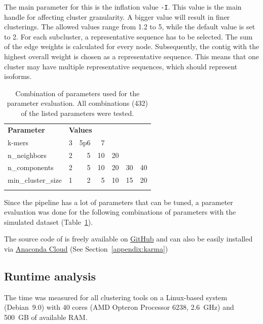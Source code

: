 \documentclass[12pt,a4paper,english]{article}
\begin{document}
	The main parameter for this is the inflation value \texttt{-I}. This value is the main handle for affecting cluster granularity. A bigger value will result in finer clusterings. The allowed values range from 1.2 to 5, while the default value is set to 2.
	For each subcluster, a representative sequence has to be selected. The sum of the edge weights is calculated for every node. Subsequently, the contig with the highest overall weight is chosen as a representative sequence. This means that one cluster may have multiple representative sequences, which should represent isoforms.
	
	\begin{table}
		\caption[Combination of parameters used for the parameter evaluation.]{Combination of parameters used for the parameter evaluation. All combinations (432) of the listed parameters were tested.}
		\label{table:comb}
		\begin{tabular}{lrrrrrr}
			\toprule
			\multicolumn{1}{l}{\textbf{Parameter}} & \multicolumn{5}{l}{\textbf{Values}} \\ \addlinespace
			\midrule
			k-mers & 3 & 5p6 & 7 &  &  &  \\ \addlinespace
			n\_neighbors & 2 & 5 & 10 & 20 &  &  \\ \addlinespace
			n\_components & 2 & 5 & 10 & 20 & 30 & 40 \\ \addlinespace
			min\_cluster\_size & 1 & 2 & 5 & 10 & 15 & 20 \\ \addlinespace
			\bottomrule
		\end{tabular}
	\end{table}
	Since the pipeline has a lot of parameters that can be tuned, a parameter evaluation was done for the following combinations of parameters with the simulated dataset (Table~\ref{table:comb}).
	
	The source code of \karma is freely available on \href{https://github.com/lmfaber/karma}{GitHub} and can also be easily installed via \href{https://anaconda.org/lmfaber/karma}{Anaconda Cloud} (See Section~\ref{appendix:karma})\\

\subsection{Runtime analysis}
The time was measured for all clustering tools on a Linux-based system (Debian~9.0) with 40 cores (AMD Opteron Processor 6238, 2.6~GHz) and 500~GB of available RAM.
\end{document}
